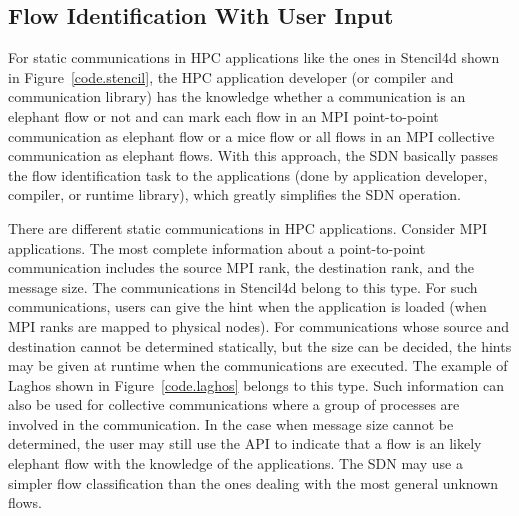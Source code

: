 \subsection{Flow Identification With User Input}

For static communications in HPC applications like the ones in Stencil4d
shown in Figure~\ref{code.stencil}, the HPC application developer (or
compiler and communication library) has
the knowledge whether a communication is an
elephant flow or not and can mark each flow in an MPI point-to-point
communication as elephant flow or a mice flow or all flows in an
MPI collective communication as elephant flows.
With this approach, the SDN basically passes the flow identification
task to the applications (done by application developer, compiler, or
runtime library), which greatly simplifies the SDN operation.

There are different static communications in HPC applications. Consider
MPI applications. The most complete information about a point-to-point
communication includes the source MPI rank, the destination rank, and the
message size. The communications in Stencil4d belong to this type. 
For such communications, users can give the hint when the
application is loaded (when MPI ranks are mapped to physical nodes).
For communications whose source and destination cannot be determined
statically, but the size can be decided, the hints may be given at runtime
when the communications are executed.
The example of Laghos shown in Figure~\ref{code.laghos} belongs to this type. 
Such information can also be used
for collective communications where a group of processes are involved in
the communication.
In the case when message size cannot be determined, the user may still use the
API to indicate that a flow is an likely
elephant flow with the knowledge of the applications. The SDN may use a
simpler flow classification than the ones dealing with the most general
unknown flows.
 

